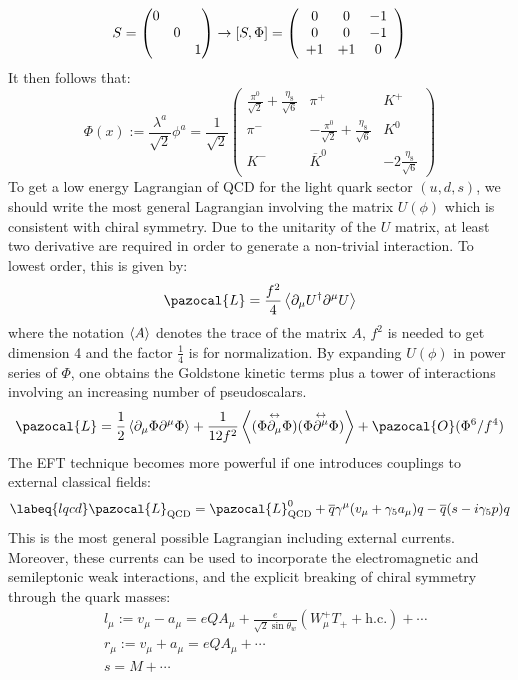 \documentclass[../main.tex]{subfiles}
\begin{document}
\[
S=\mqty(\dmat{0,0,1})\to[S,\Phi]=\left(\begin{array}{ccc}
    0 & 0 & -1 \\
    0 & 0 & -1 \\
    +1 & +1 & 0
\end{array}\right)
\]
It then follows that:
\[
\Phi(x):=\frac{\lambda^a}{\sqrt{2}}\phi^a=\frac{1}{\sqrt{2}}\left(\begin{array}{ccc}
    \frac{\pi^0}{\sqrt{2}}+\frac{\eta_8}{\sqrt{6}} & \pi^+ & K^+ \\
    \pi^- & -\frac{\pi^0}{\sqrt{2}}+\frac{\eta_8}{\sqrt{6}} & K^0 \\
    K^- & \overline{K}^0 & -2\frac{\eta_8}{\sqrt{6}}
\end{array}\right)
\]
To get a low energy Lagrangian of QCD for the light quark sector $(u, d, s)$, we should write the most general Lagrangian involving the matrix $U(\phi)$ which is consistent with chiral symmetry. Due to the unitarity of the $U$ matrix, at least two derivative are required in order to generate a non-trivial interaction. To lowest order, this is given by:
\[
\pazocal{L}=\frac{f^2}{4}\Braket{\partial_\mu U^\dagger\partial^\mu U}
\]
where the notation $\Braket{A}$ denotes the trace of the matrix $A$, $f^2$ is needed to get dimension 4 and the factor $\frac{1}{4}$ is for normalization. By expanding $U(\phi)$ in power series of $\Phi$, one obtains the Goldstone kinetic terms plus a tower of interactions involving an increasing number of pseudoscalars. 
\[
\pazocal{L}=\frac{1}{2}\Braket{\partial_\mu\Phi\partial^\mu\Phi}+\frac{1}{12f^2}\Braket{(\Phi\overset{\leftrightarrow}{\partial_\mu}\Phi)(\Phi\overset{\leftrightarrow}{\partial^\mu}\Phi)}+\pazocal{O}(\Phi^6/f^4)
\]
The EFT technique becomes more powerful if one introduces couplings to external classical fields:
\begin{equation}
\labeq{lqcd}
\pazocal{L}_{\text{QCD}}=\pazocal{L}_{\text{QCD}}^0+\overline{q}\gamma^\mu(v_\mu+\gamma_5a_\mu)q-\overline{q}(s-i\gamma_5p)q
\end{equation}
This is the most general possible Lagrangian including external currents. Moreover, these currents can be used to incorporate the electromagnetic and semileptonic weak interactions, and the explicit breaking of chiral symmetry through the quark masses:
\[
\begin{aligned}
&l_\mu:=v_\mu-a_\mu=eQA_\mu+\frac{e}{\sqrt{2}\sin\theta_w}(W_\mu^+ T_++\text{h.c.})+\cdots\\
&r_\mu:=v_\mu+a_\mu=eQA_\mu+\cdots\\
&s=M+\cdots
\end{aligned}
\]
\end{document}

